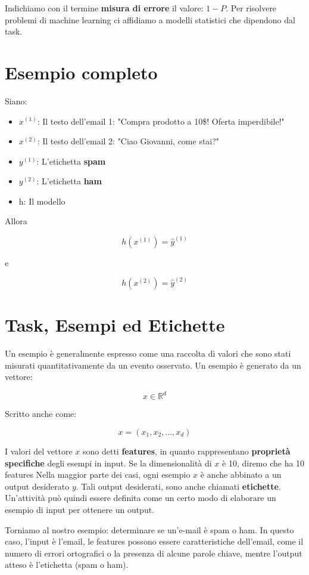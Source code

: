 \noindent
Indichiamo con il termine \textbf{misura di errore} il valore: $1 - P$. Per risolvere problemi di machine learning ci affidiamo a modelli statistici che dipendono dal task.

\section{Esempio completo}

Siano:

\begin{itemize}
\item $x^{(1)}$: Il testo dell'email 1: "Compra prodotto a 10\$! Oferta imperdibile!"
\item $x^{(2)}$: Il testo dell'email 2: "Ciao Giovanni, come stai?"

\item $y^{(1)}$: L'etichetta \textbf{spam}
\item $y^{(2)}$: L'etichetta \textbf{ham}
\item h: Il modello
\end{itemize}

\noindent
Allora

$$ h(x^{(1)}) = \hat{y}^{(1)} $$

\noindent
e

$$ h(x^{(2)}) = \hat{y}^{(2)} $$

\section{Task, Esempi ed Etichette}

Un esempio è generalmente espresso come una raccolta di valori che sono stati misurati quantitativamente da un evento osservato. Un esempio è generato da un vettore:

$$ x \in \mathbb{R}^{d} $$

\noindent
Scritto anche come:

$$ x = (x_1, x_2, ..., x_d)$$

I valori del vettore $x$ sono detti \textbf{features}, in quanto rappresentano \textbf{proprietà specifiche} degli esempi in input. Se la dimensionalità di $x$ è 10, diremo che ha 10 features Nella maggior parte dei casi, ogni esempio $x$ è anche abbinato a un output desiderato $y$. Tali output desiderati, sono anche chiamati \textbf{etichette}. Un'attività può quindi essere definita come un certo modo di elaborare un esempio di input per ottenere un output.

Torniamo al nostro esempio: determinare se un'e-mail è spam o ham. In questo caso, l'input è l'email, le features possono essere caratteristiche dell'email, come il numero di errori ortografici o la presenza di alcune parole chiave, mentre l'output atteso è l'etichetta (spam o ham).


